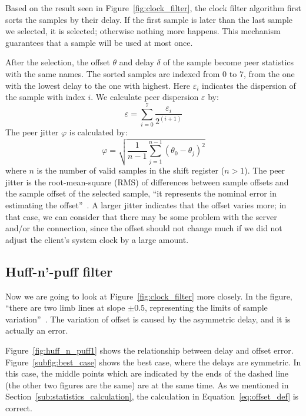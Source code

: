 Based on the result seen in Figure~\ref{fig:clock_filter}, the clock filter
algorithm first sorts the samples by their delay. If the first sample is later
than the last sample we selected, it is selected; otherwise nothing more
happens. This mechanism guarantees that a sample will be used at most
once.

After the selection, the offset $\theta$ and delay $\delta$ of the sample
become peer statistics with the same names. The sorted samples are indexed from
0 to 7, from the one with the lowest delay to the one with highest. Here
$\varepsilon_i$ indicates the dispersion of the sample with index $i$. We
calculate peer dispersion $\varepsilon$ by:
\begin{equation}
    \varepsilon = \sum^{7}_{i=0} \frac{\varepsilon_i}{2^{(i+1)}}
    \label{eq:peer_dispersion}
\end{equation}
The peer jitter $\varphi$ is calculated by:
\begin{equation}
    \varphi = \sqrt{\frac{1}{n-1} \sum^{n-1}_{j=1} (\theta_0 - \theta_j)^2}
    \label{eq:peer_jitter}
\end{equation}
where $n$ is the number of valid samples in the shift register ($n > 1$).
The peer jitter is the root-mean-square (RMS) of differences between sample
offsets and the sample offset of the selected sample, ``it represents the
nominal error in estimating the offset''~\cite{rfc5905}. A larger jitter
indicates that the offset varies more; in that case, we can consider that there
may be some problem with the server and/or the connection, since the offset
should not change much if we did not adjust the client's system clock by a
large amount.

\subsection{Huff-n'-puff filter}%
\label{sub:huff_n_puff_filter}
Now we are going to look at Figure~\ref{fig:clock_filter} more closely. In the
figure, ``there are two limb lines at slope $\pm0.5$, representing the
limits of sample variation''~\cite{clock_filter}.
The variation of offset is caused by the asymmetric delay, and it is actually
an error.

Figure~\ref{fig:huff_n_puff1} shows the relationship between delay and offset
error.  Figure~\ref{subfig:best_case} shows the best case, where the delays are
symmetric. In this case, the middle points which are indicated by the ends of
the dashed line (the other two figures are the same) are at the same time. As
we mentioned in Section~\ref{sub:statistics_calculation}, the calculation in
Equation~\ref{eq:offset_def} is correct. 

